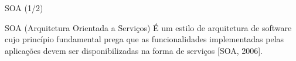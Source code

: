 \documentclass[xcolor=svgnames]{beamer}
\begin{document}

    \begin{frame}{SOA (1/2)}
            \begin{block}{SOA (Arquitetura Orientada a Serviços)}\vspace{-.3\baselineskip}
            É um estilo de arquitetura de software cujo princípio fundamental prega que as funcionalidades implementadas pelas
	    aplicações devem ser disponibilizadas na forma de serviços [SOA, 2006]. %
            \end{block}

    \end{frame}
\end{document}
